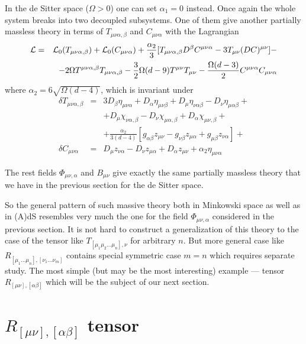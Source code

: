 \documentclass[a4paper,12pt]{article}
\begin{document}
In the de Sitter space ($\Omega > 0$) one can set $\alpha_1 = 0$
instead. Once again the whole system breaks into two decoupled
subsystems. One of them give another partially massless theory
in terms of $T_{\mu\nu\alpha,\beta}$ and $C_{\mu\nu\alpha}$ with
the Lagrangian
\begin{eqnarray}
{\cal L} &=& {\cal L}_0 (T_{\mu\nu\alpha,\beta}) + {\cal L}_0
(C_{\mu\nu\alpha}) + \frac{\alpha_2}{3} [ T_{\mu\nu\alpha,\beta}
D^\beta C^{\mu\nu\alpha} - 3 T_{\mu\nu} (D C)^{\mu\nu} ] - \nonumber \\
 && - 2 \Omega T^{\mu\nu\alpha,\beta} T_{\mu\nu\alpha,\beta} -
 \frac{3}{2} \Omega (d-9) T^{\mu\nu} T_{\mu\nu} -
 \frac{\Omega (d-3)}{2} C^{\mu\nu\alpha} C_{\mu\nu\alpha}
\end{eqnarray}
where $\alpha_2 = 6\sqrt{\Omega(d-4)}$, which is invariant under
\begin{eqnarray}
\delta T_{\mu\nu\alpha,\beta} &=& 3 D_\beta \eta_{\mu\nu\alpha}
+ D_\alpha \eta_{\mu\nu\beta} + D_\mu \eta_{\nu\alpha\beta}
- D_\nu \eta_{\mu\alpha\beta} + \nonumber \\
 && + D_\mu \chi_{\nu\alpha,\beta} - D_\nu
\chi_{\mu\alpha,\beta} + D_\alpha \chi_{\mu\nu,\beta} + \nonumber \\
 && + \frac{\alpha_2}{3(d-4)} [ g_{\alpha\beta} z_{\mu\nu}
 - g_{\nu\beta} z_{\mu\alpha} + g_{\mu\beta} z_{\nu\alpha} ] + \\
\delta C_{\mu\nu\alpha} &=& D_\mu z_{\nu\alpha} - D_\nu
z_{\mu\alpha} + D_\alpha z_{\mu\nu} + \alpha_2 \eta_{\mu\nu\alpha} \nonumber
\end{eqnarray}

The rest fields $\Phi_{\mu\nu,\alpha}$ and $B_{\mu\nu}$ give exactly
the same partially massless theory that we have in the previous section
for the de Sitter space.

So the general pattern of such massive theory both in Minkowski space
as well as in (A)dS resembles very much the one for the field
$\Phi_{\mu\nu,\alpha}$ considered in the previous section. It is not
hard to construct a generalization of this theory to the case of
the tensor like $T_{[\mu_1\mu_2\dots\mu_n],\nu}$ for arbitrary $n$.
But more general case like $R_{[\mu_1\dots\mu_n],[\nu_1\dots\nu_m]}$
contains special symmetric case $m=n$ which requires separate study.
The most simple (but may be the most interesting) example --- tensor
$R_{[\mu\nu],[\alpha\beta]}$ which will be the subject of our next
section.

\section{$R_{[\mu\nu],[\alpha\beta]}$ tensor}
\end{document}
